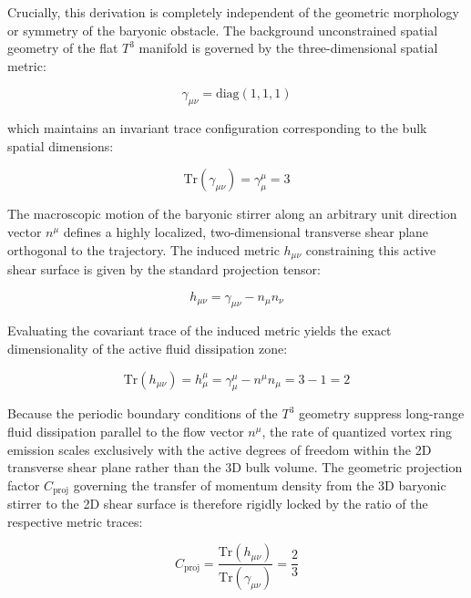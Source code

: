 \documentclass[aps,prd,10pt,twocolumn,superscriptaddress,nofootinbib,floatfix]{revtex4-2}
\begin{document}
Crucially, this derivation is completely independent of the geometric morphology or symmetry of the baryonic obstacle. The background unconstrained spatial geometry of the flat $T^3$ manifold is governed by the three-dimensional spatial metric:

\begin{equation}
\gamma_{\mu\nu} = \text{diag}(1, 1, 1)
\end{equation}

which maintains an invariant trace configuration corresponding to the bulk spatial dimensions:

\begin{equation}
\text{Tr}(\gamma_{\mu\nu}) = \gamma^\mu_\mu = 3
\end{equation}

The macroscopic motion of the baryonic stirrer along an arbitrary unit direction vector $n^\mu$ defines a highly localized, two-dimensional transverse shear plane orthogonal to the trajectory. The induced metric $h_{\mu\nu}$ constraining this active shear surface is given by the standard projection tensor:

\begin{equation}
h_{\mu\nu} = \gamma_{\mu\nu} - n_{\mu}n_{\nu}
\end{equation}

Evaluating the covariant trace of the induced metric yields the exact dimensionality of the active fluid dissipation zone:

\begin{equation}
\text{Tr}(h_{\mu\nu}) = h^\mu_\mu = \gamma^\mu_\mu - n^\mu n_\mu = 3 - 1 = 2
\end{equation}

Because the periodic boundary conditions of the $T^3$ geometry suppress long-range fluid dissipation parallel to the flow vector $n^\mu$, the rate of quantized vortex ring emission scales exclusively with the active degrees of freedom within the 2D transverse shear plane rather than the 3D bulk volume. The geometric projection factor $C_{\text{proj}}$ governing the transfer of momentum density from the 3D baryonic stirrer to the 2D shear surface is therefore rigidly locked by the ratio of the respective metric traces:

\begin{equation}
C_{\text{proj}} = \frac{\text{Tr}(h_{\mu\nu})}{\text{Tr}(\gamma_{\mu\nu})} = \frac{2}{3}
\end{equation}
\end{document}
